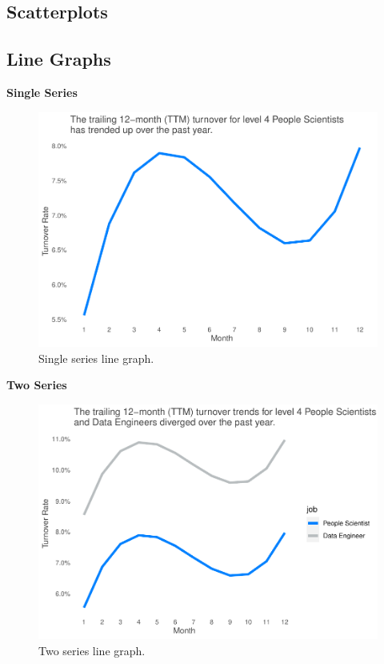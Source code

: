 \documentclass[
]{book}
\begin{document}
\hypertarget{scatterplots}{%
\subsection{Scatterplots}\label{scatterplots}}

\hypertarget{line-graphs}{%
\subsection{Line Graphs}\label{line-graphs}}

\textbf{Single Series}

\begin{figure}

{\centering \includegraphics[width=1\linewidth]{People_Analytics_Lifecycle_files/figure-latex/single-line-graph-1} 

}

\caption{Single series line graph.}\label{fig:single-line-graph}
\end{figure}

\textbf{Two Series}

\begin{figure}

{\centering \includegraphics[width=1\linewidth]{People_Analytics_Lifecycle_files/figure-latex/double-line-graph-1} 

}

\caption{Two series line graph.}\label{fig:double-line-graph}
\end{figure}
\end{document}
